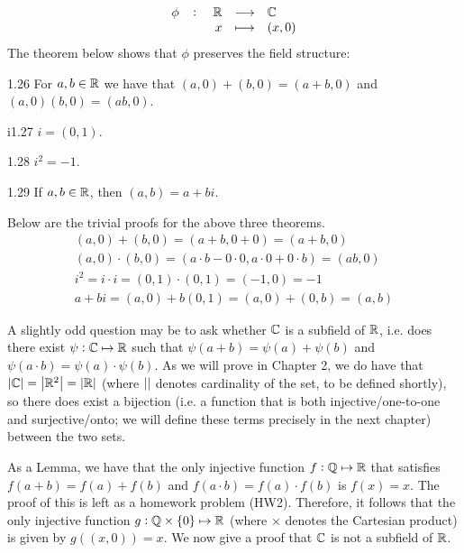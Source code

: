 \begin{align*}
    \fullfunction{\phi}{\RR}{\CC}{x}{(x, 0)}
\end{align*}
The theorem below shows that $\phi$ preserves the field structure:
\begin{theorem}{}{1.26}
    For $a, b \in \mathbb{R}$ we have that $(a, 0) + (b, 0) = (a + b, 0)$ and $(a, 0)(b, 0) = (ab, 0)$.
\end{theorem}
\begin{definition}{i}{1.27}
    $i = (0, 1)$. 
\end{definition}
\begin{theorem}{}{1.28}
    $i^2 = -1$. 
\end{theorem}
\begin{theorem}{}{1.29}
    If $a, b \in \mathbb{R}$, then $(a, b) = a + bi$. 
\end{theorem}
\begin{nproof}
    Below are the trivial proofs for the above three theorems. 
    \begin{align*}
        (a, 0) + (b, 0) = (a + b, 0 + 0) = (a + b, 0)
        \\ (a, 0)\cdot(b, 0) = (a\cdot b - 0 \cdot 0, a \cdot 0 + 0 \cdot b) = (ab, 0)
        \\ i^2 = i\cdot i = (0, 1) \cdot (0, 1) = (-1, 0) = -1
        \\ a + bi = (a, 0) + b(0, 1) = (a, 0) + (0, b) = (a, b)
    \end{align*}
\end{nproof}
\noindent A slightly odd question may be to ask whether $\mathbb{C}$ is a subfield of $\mathbb{R}$, i.e. does there exist $\psi: \mathbb{C} \mapsto \mathbb{R}$ such that $\psi(a + b) = \psi(a) + \psi(b)$ and $\psi(a\cdot b) = \psi(a) \cdot \psi(b)$. As we will prove in Chapter 2, we do have that $\abs{\mathbb{C}} = \abs{\mathbb{R}^2} = \abs{\mathbb{R}}$ (where $\abs{}$ denotes cardinality of the set, to be defined shortly), so there does exist a bijection (i.e. a function that is both injective/one-to-one and surjective/onto; we will define these terms precisely in the next chapter) between the two sets.

As a Lemma, we have that the only injective function $f: \mathbb{Q} \mapsto \mathbb{R}$ that satisfies $f(a+b) = f(a) + f(b)$ and $f(a\cdot b) = f(a)\cdot f(b)$ is $f(x) = x$. The proof of this is left as a homework problem (HW2). Therefore, it follows that the only injective function $g: \mathbb{Q} \times \set{0} \mapsto \mathbb{R}$ (where $\times$ denotes the Cartesian product) is given by $g((x, 0)) = x$. We now give a proof that $\mathbb{C}$ is not a subfield of $\mathbb{R}$. 

